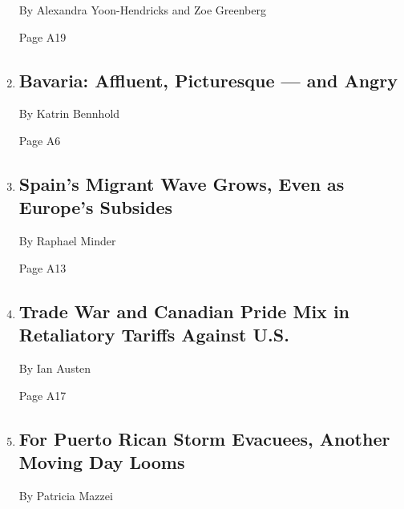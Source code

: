 \begin{enumerate}
  By Alexandra Yoon-Hendricks and Zoe Greenberg

  Page A19
\item
  \href{/2018/06/30/world/europe/bavaria-immigration-afd-munich.html}{}

  \hypertarget{bavaria-affluent-picturesque--and-angry}{%
  \subsection{Bavaria: Affluent, Picturesque --- and
  Angry}\label{bavaria-affluent-picturesque--and-angry}}

  By Katrin Bennhold

  Page A6
\item
  \href{/2018/06/30/world/europe/spain-migrants-morocco.html}{}

  \hypertarget{spains-migrant-wave-grows-even-as-europes-subsides}{%
  \subsection{Spain's Migrant Wave Grows, Even as Europe's
  Subsides}\label{spains-migrant-wave-grows-even-as-europes-subsides}}

  By Raphael Minder

  Page A13
\item
  \href{/2018/06/30/business/canada-day-tariffs-trade.html}{}

  \hypertarget{trade-war-and-canadian-pride-mix-in-retaliatory-tariffs-against-us}{%
  \subsection{Trade War and Canadian Pride Mix in Retaliatory Tariffs
  Against
  U.S.}\label{trade-war-and-canadian-pride-mix-in-retaliatory-tariffs-against-us}}

  By Ian Austen

  Page A17
\item
  \href{/2018/06/30/us/puerto-rico-fema-housing-orlando.html}{}

  \hypertarget{for-puerto-rican-storm-evacuees-another-moving-day-looms}{%
  \subsection{For Puerto Rican Storm Evacuees, Another Moving Day
  Looms}\label{for-puerto-rican-storm-evacuees-another-moving-day-looms}}

  By Patricia Mazzei


\end{enumerate}
